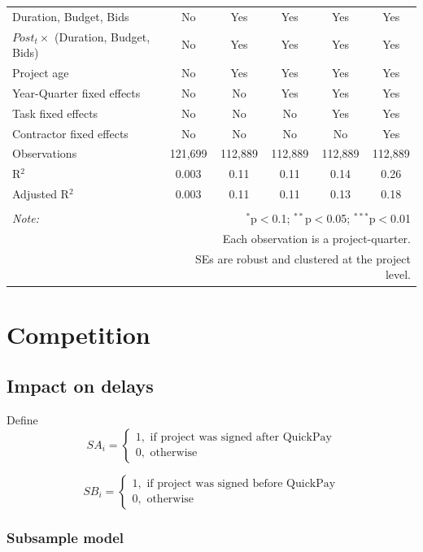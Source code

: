 \documentclass[
]{article}
\begin{document}
\begin{table}[H]
\begin{tabular}{@{\extracolsep{-2pt}}lccccc}
Duration, Budget, Bids & No & Yes & Yes & Yes & Yes \\ 
$Post_t \times $  (Duration, Budget, Bids) & No & Yes & Yes & Yes & Yes \\ 
Project age & No & Yes & Yes & Yes & Yes \\ 
Year-Quarter fixed effects & No & No & Yes & Yes & Yes \\ 
Task fixed effects & No & No & No & Yes & Yes \\ 
Contractor fixed effects & No & No & No & No & Yes \\ 
Observations & 121,699 & 112,889 & 112,889 & 112,889 & 112,889 \\ 
R$^{2}$ & 0.003 & 0.11 & 0.11 & 0.14 & 0.26 \\ 
Adjusted R$^{2}$ & 0.003 & 0.11 & 0.11 & 0.13 & 0.18 \\ 
\hline 
\hline \\[-1.8ex] 
\textit{Note:}  & \multicolumn{5}{r}{$^{*}$p$<$0.1; $^{**}$p$<$0.05; $^{***}$p$<$0.01} \\ 
 & \multicolumn{5}{r}{Each observation is a project-quarter.} \\ 
 & \multicolumn{5}{r}{SEs are robust and clustered at the project level.} \\ 
\end{tabular} 
\end{table}

\hypertarget{competition}{%
\section{Competition}\label{competition}}

\hypertarget{impact-on-delays}{%
\subsection{Impact on delays}\label{impact-on-delays}}

Define
\[ SA_i = \begin{cases} 1, \text{ if project was signed after QuickPay}\\
0, \text{ otherwise} \end{cases}\]

\[ SB_i = \begin{cases} 1, \text{ if project was signed before QuickPay}\\
0, \text{ otherwise} \end{cases}\]

\hypertarget{subsample-model}{%
\subsubsection{Subsample model}\label{subsample-model}}
\end{document}
